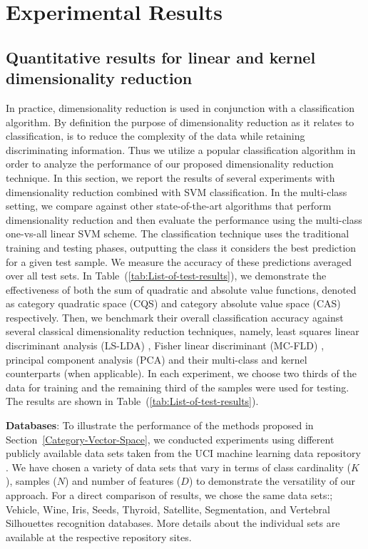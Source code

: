 
\section{Experimental Results}

\subsection{Quantitative results for linear and kernel dimensionality reduction}

In practice, dimensionality reduction is used in conjunction with
a classification algorithm. By definition the purpose of dimensionality
reduction as it relates to classification, is to reduce the complexity
of the data while retaining discriminating information. Thus we utilize
a popular classification algorithm in order to analyze the performance
of our proposed dimensionality reduction technique. In this section,
we report the results of several experiments with dimensionality reduction
combined with SVM classification. In the multi-class setting, we compare
against other state-of-the-art algorithms that perform dimensionality
reduction and then evaluate the performance using the multi-class
one-vs-all linear SVM scheme. The classification technique uses the
traditional training and testing phases, outputting the class it considers
the best prediction for a given test sample. We measure the accuracy
of these predictions averaged over all test sets. In Table~(\ref{tab:List-of-test-results}),
we demonstrate the effectiveness of both the sum of quadratic and
absolute value functions, denoted as category quadratic space (CQS)
and category absolute value space (CAS) respectively. Then, we benchmark
their overall classification accuracy against several classical dimensionality
reduction techniques, namely, least squares linear discriminant analysis
(LS-LDA) \citep{Ye2007}, Fisher linear discriminant (MC-FLD) \citep{fisher1936use},
principal component analysis (PCA) \citep{rao1964use} and their multi-class
and kernel counterparts (when applicable). In each experiment, we
choose two thirds of the data for training and the remaining third
of the samples were used for testing. The results are shown in Table~(\ref{tab:List-of-test-results}).

\textbf{Databases}: To illustrate the performance of the methods proposed
in Section~\ref{Category-Vector-Space}, we conducted experiments
using different publicly available data sets taken from the UCI machine
learning data repository \citep{Lichman:2013}. We have chosen a variety
of data sets that vary in terms of class cardinality ($K$), samples
($N$) and number of features ($D$) to demonstrate the versatility
of our approach. For a direct comparison of results, we chose the
same data sets:; Vehicle, Wine, Iris, Seeds, Thyroid, Satellite, Segmentation,
and Vertebral Silhouettes recognition databases. More details about
the individual sets are available at the respective repository sites.

